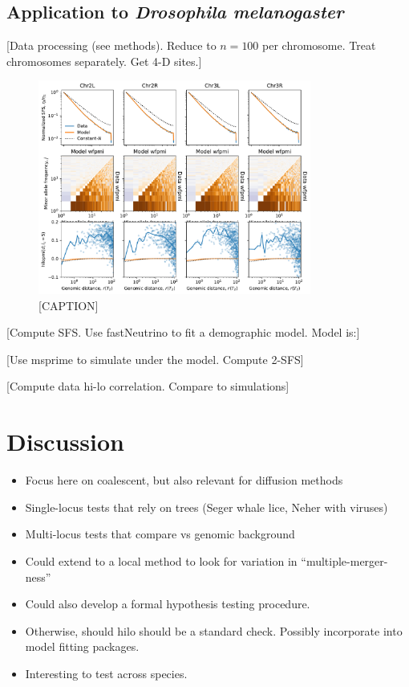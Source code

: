 \documentclass[11pt, letterpaper]{article}   	%
\begin{document}
\subsection*{Application to \textit{Drosophila melanogaster}}

[Data processing (see methods). Reduce to $n=100$ per chromosome. Treat chromosomes separately. Get 4-D sites.]

\begin{figure}
\centering
\includegraphics[width=0.8\textwidth]{figures/figure6.pdf}
\caption{[CAPTION] \label{fig:dpgp3}}
\end{figure}

[Compute SFS. Use fastNeutrino to fit a demographic model. Model is:]

[Use msprime to simulate under the model. Compute 2-SFS]

[Compute data hi-lo correlation. Compare to simulations]

\section*{Discussion}
\begin{itemize}
    \item Focus here on coalescent, but also relevant for diffusion methods
    \item Single-locus tests that rely on trees (Seger whale lice, Neher with viruses)
    \item Multi-locus tests that compare vs genomic background
    \item Could extend to a local method to look for variation in ``multiple-merger-ness''
    \item Could also develop a formal hypothesis testing procedure.
    \item Otherwise, should hilo should be a standard check. Possibly incorporate into model fitting packages.
    \item Interesting to test across species.
\end{itemize}
\end{document}
